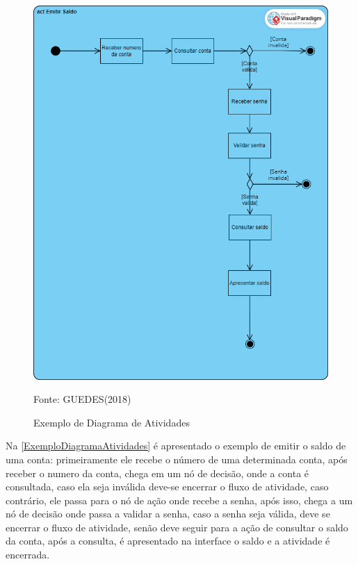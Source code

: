 \documentclass[12pt,openright,oneside,a4paper,
	chapter=TITLE,
	section=TITLE,
	english,brazil]{abntex2}
\begin{document}
\begin{figure}[!htp]
	\caption{Exemplo de Diagrama de Atividades}
	\centering
	\includegraphics[scale=0.2]{img/ExemploDiagramaAtividades.png}
	\\
	\label{ExemploDiagramaAtividades}
	\footnotesize\raggedright Fonte: GUEDES(2018)
\end{figure}

Na \autoref{ExemploDiagramaAtividades} é apresentado o exemplo de emitir o saldo de uma conta: primeiramente ele recebe o número de uma determinada conta, após receber o numero da conta, chega em um nó de decisão, onde a conta é consultada, caso ela seja inválida deve-se encerrar o fluxo de atividade, caso contrário, ele passa para o nó de ação onde recebe a senha, após isso, chega a um nó de decisão onde passa a validar a senha, caso a senha seja válida, deve se encerrar o fluxo de atividade, senão deve seguir para a ação de consultar o saldo da conta, após a consulta, é apresentado na interface o saldo e a atividade é encerrada.
\end{document}
